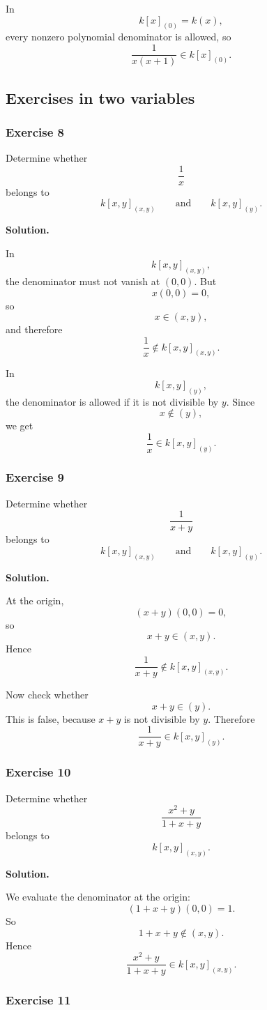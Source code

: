 \documentclass[12pt,a4paper]{article}
\theoremstyle{notespace}
\theoremstyle{definition}
\begin{document}
In
\[
k[x]_{(0)}=k(x),
\]
every nonzero polynomial denominator is allowed, so
\[
\frac{1}{x(x+1)}\in k[x]_{(0)}.
\]

\subsection{Exercises in two variables}

\subsubsection{Exercise 8}

Determine whether
\[
\frac{1}{x}
\]
belongs to
\[
k[x,y]_{(x,y)}
\qquad\text{and}\qquad
k[x,y]_{(y)}.
\]

\textbf{Solution.}

In
\[
k[x,y]_{(x,y)},
\]
the denominator must not vanish at \((0,0)\). But
\[
x(0,0)=0,
\]
so
\[
x\in (x,y),
\]
and therefore
\[
\frac{1}{x}\notin k[x,y]_{(x,y)}.
\]

In
\[
k[x,y]_{(y)},
\]
the denominator is allowed if it is not divisible by \(y\). Since
\[
x\notin (y),
\]
we get
\[
\frac{1}{x}\in k[x,y]_{(y)}.
\]

\subsubsection{Exercise 9}

Determine whether
\[
\frac{1}{x+y}
\]
belongs to
\[
k[x,y]_{(x,y)}
\qquad\text{and}\qquad
k[x,y]_{(y)}.
\]

\textbf{Solution.}

At the origin,
\[
(x+y)(0,0)=0,
\]
so
\[
x+y\in (x,y).
\]
Hence
\[
\frac{1}{x+y}\notin k[x,y]_{(x,y)}.
\]

Now check whether
\[
x+y\in (y).
\]
This is false, because \(x+y\) is not divisible by \(y\). Therefore
\[
\frac{1}{x+y}\in k[x,y]_{(y)}.
\]

\subsubsection{Exercise 10}

Determine whether
\[
\frac{x^2+y}{1+x+y}
\]
belongs to
\[
k[x,y]_{(x,y)}.
\]

\textbf{Solution.}

We evaluate the denominator at the origin:
\[
(1+x+y)(0,0)=1.
\]
So
\[
1+x+y\notin (x,y).
\]
Hence
\[
\frac{x^2+y}{1+x+y}\in k[x,y]_{(x,y)}.
\]

\subsubsection{Exercise 11}
\end{document}
